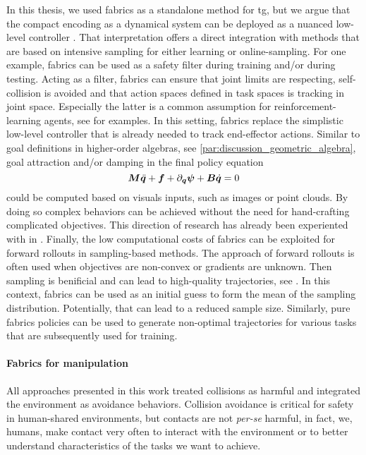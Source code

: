 In this thesis, we used \ac{fabrics} as a standalone method for \ac{tg}, but we
argue that the compact encoding as a dynamical system can be deployed as a
nuanced low-level controller \cite{ratliff2023fabrics,vanwyk2024geometric}.
That interpretation offers a direct integration with methods that are based on 
intensive sampling for either learning or online-sampling.
For one
example, \ac{fabrics} can be used as a safety filter during training and/or
during testing. Acting as a filter, \ac{fabrics} can ensure that joint limits
are respecting, self-collision is avoided and that action spaces defined in task
spaces is tracking in joint space. Especially the latter is a common assumption
for reinforcement-learning agents, see
\cite{hansen2020self,hansen2021generalization} for examples. In this setting,
\ac{fabrics} replace the simplistic low-level controller that is already
needed to track end-effector actions.
Similar to goal definitions in higher-order algebras, see
\cref{par:discussion_geometric_algebra}, goal attraction and/or damping in the final
policy equation 
\[
  \bm{M}\ddot{\bm{q}} + \bm{f} + \partial_{\bm{q}}\bm{\psi} + \bm{B}\dot{\bm{q}} = 0
\]
could be computed based on visuals inputs, such as images or point clouds. By
doing so complex behaviors can be achieved without the need for hand-crafting
complicated objectives. This direction of research has already been experiented
with in \cite{vanwyk2024geometric}.
Finally, the low computational costs of \ac{fabrics} can be exploited for
forward rollouts in sampling-based methods. The approach of forward rollouts is
often used when objectives are non-convex or gradients are unknown. Then
sampling is benificial and can lead to high-quality trajectories, see
\cite{Pezzato2023sampling}. In this context, \ac{fabrics} can be used as an
initial guess to form the mean of the sampling distribution. Potentially, that
can lead to a reduced sample size. Similarly, pure \ac{fabrics} policies can be
used to generate non-optimal trajectories for various tasks that are
subsequently used for training.

\paragraph{Fabrics for manipulation}
\label{par:discussion_fabrics_for_manipulation}

All approaches presented in this work treated collisions as harmful and integrated
the environment as avoidance behaviors. Collision avoidance is critical for
safety in human-shared environments, but contacts are not \textit{per-se} harmful, 
in fact, we, humans, make contact very often to interact with the environment or
to better understand characteristics of the tasks we want to achieve.


  




